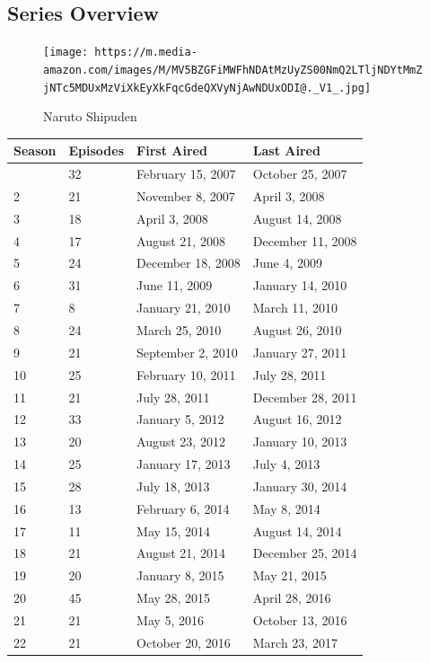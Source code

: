 \documentclass[
  letterpaper,
  DIV=11,
  numbers=noendperiod]{scrartcl}
\begin{document}
\hypertarget{series-overview-1}{%
\subsection{Series Overview}\label{series-overview-1}}

\begin{figure}

{\centering \texttt{[image: https://m.media-amazon.com/images/M/MV5BZGFiMWFhNDAtMzUyZS00NmQ2LTljNDYtMmZjNTc5MDUxMzViXkEyXkFqcGdeQXVyNjAwNDUxODI@.\_V1\_.jpg]}

}

\caption{Naruto Shipuden}

\end{figure}

\begin{longtable}[]{@{}llll@{}}
\toprule\noalign{}
Season & Episodes & First Aired & Last Aired \\
\midrule\noalign{}
\endhead
\bottomrule\noalign{}
\endlastfoot
1 & 32 & February 15, 2007 & October 25, 2007 \\
2 & 21 & November 8, 2007 & April 3, 2008 \\
3 & 18 & April 3, 2008 & August 14, 2008 \\
4 & 17 & August 21, 2008 & December 11, 2008 \\
5 & 24 & December 18, 2008 & June 4, 2009 \\
6 & 31 & June 11, 2009 & January 14, 2010 \\
7 & 8 & January 21, 2010 & March 11, 2010 \\
8 & 24 & March 25, 2010 & August 26, 2010 \\
9 & 21 & September 2, 2010 & January 27, 2011 \\
10 & 25 & February 10, 2011 & July 28, 2011 \\
11 & 21 & July 28, 2011 & December 28, 2011 \\
12 & 33 & January 5, 2012 & August 16, 2012 \\
13 & 20 & August 23, 2012 & January 10, 2013 \\
14 & 25 & January 17, 2013 & July 4, 2013 \\
15 & 28 & July 18, 2013 & January 30, 2014 \\
16 & 13 & February 6, 2014 & May 8, 2014 \\
17 & 11 & May 15, 2014 & August 14, 2014 \\
18 & 21 & August 21, 2014 & December 25, 2014 \\
19 & 20 & January 8, 2015 & May 21, 2015 \\
20 & 45 & May 28, 2015 & April 28, 2016 \\
21 & 21 & May 5, 2016 & October 13, 2016 \\
22 & 21 & October 20, 2016 & March 23, 2017 \\
\end{longtable}
\end{document}
